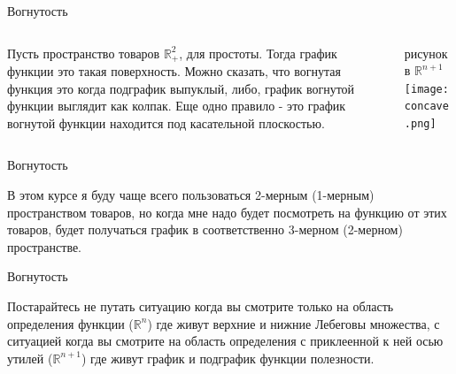 \documentclass{beamer}
\begin{document}
\begin{frame}{Вогнутость}

\begin{columns}
\begin{column}{0.5\textwidth}
   Пусть пространство товаров $\mathbb{R}^{2}_+$, для простоты. Тогда график функции это такая поверхность. Можно сказать, что \alert{вогнутая функция это когда подграфик выпуклый}, либо, \alert{график вогнутой функции выглядит как колпак}. Еще одно правило - это \alert{график вогнутой функции находится под касательной плоскостью.}\end{column}
\begin{column}{0.5\textwidth}  %
    \begin{center}
    рисунок в $\mathbb{R}^{n+1}$
     \texttt{[image: concave.png]}
     \end{center}
\end{column}
\end{columns}

\end{frame}

\begin{frame}{Вогнутость}

В этом курсе я буду чаще всего пользоваться 2-мерным (1-мерным) пространством товаров, но когда мне надо будет посмотреть на функцию от этих товаров, будет получаться график в соответственно 3-мерном (2-мерном) пространстве.

\end{frame}


\begin{frame}{Вогнутость}

Постарайтесь не путать ситуацию когда вы смотрите только на область определения функции ($\mathbb{R}^{n}$) где живут верхние и нижние Лебеговы множества, с ситуацией когда вы смотрите на область определения с приклеенной к ней осью утилей ($\mathbb{R}^{n+1}$) где живут график и подграфик функции полезности.

\end{frame}
\end{document}
